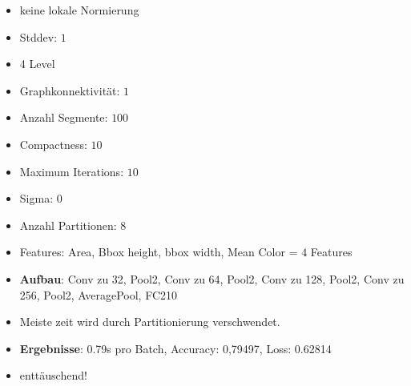 \begin{itemize}
  \item keine lokale Normierung
  \item Stddev: $1$
  \item 4 Level
  \item Graphkonnektivität: $1$
  \item Anzahl Segmente: $100$
  \item Compactness: $10$
  \item Maximum Iterations: $10$
  \item Sigma: $0$
  \item Anzahl Partitionen: 8
  \item Features: Area, Bbox height, bbox width, Mean Color = $4$ Features
  \item \textbf{Aufbau}: Conv zu 32, Pool2, Conv zu 64, Pool2, Conv zu 128, Pool2, Conv zu 256, Pool2, AveragePool, FC210
  \item Meiste zeit wird durch Partitionierung verschwendet.
  \item \textbf{Ergebnisse}: 0.79s pro Batch, Accuracy: 0,79497, Loss: 0.62814
  \item enttäuschend!
\end{itemize}
